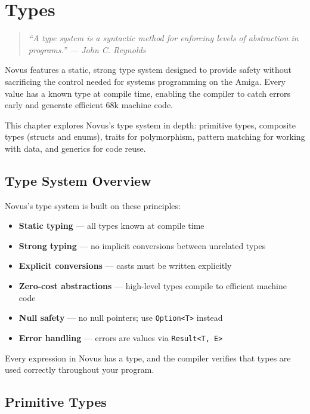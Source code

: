 \chapter{Types}
\label{ch:types}

\begin{quote}
\textit{``A type system is a syntactic method for enforcing levels of abstraction in programs.'' --- John C. Reynolds}
\end{quote}

Novus features a static, strong type system designed to provide safety without sacrificing the control needed for systems programming on the Amiga. Every value has a known type at compile time, enabling the compiler to catch errors early and generate efficient 68k machine code.

This chapter explores Novus's type system in depth: primitive types, composite types (structs and enums), traits for polymorphism, pattern matching for working with data, and generics for code reuse.

\section{Type System Overview}

Novus's type system is built on these principles:

\begin{itemize}
\item \textbf{Static typing} --- all types known at compile time
\item \textbf{Strong typing} --- no implicit conversions between unrelated types
\item \textbf{Explicit conversions} --- casts must be written explicitly
\item \textbf{Zero-cost abstractions} --- high-level types compile to efficient machine code
\item \textbf{Null safety} --- no null pointers; use \texttt{Option<T>} instead
\item \textbf{Error handling} --- errors are values via \texttt{Result<T, E>}
\end{itemize}

Every expression in Novus has a type, and the compiler verifies that types are used correctly throughout your program.

\section{Primitive Types}

